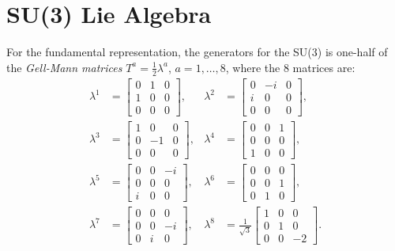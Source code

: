 \documentclass[aps,prb,superscriptaddress,nofootinbib]{revtex4}
\begin{document}
\section{SU(3) Lie Algebra}
For the fundamental representation, the generators for the SU(3) is one-half of the \textit{Gell-Mann matrices} $T^a = \frac{1}{2}\lambda^a$, $a=1,\dots,8$, where the 8 matrices are:
\begin{equation}
\begin{aligned}
	\lambda^1 &= \left[\begin{array}{ccc}
		0 & 1 & 0 \\ 1 & 0 & 0 \\ 0 & 0 & 0
	\end{array} \right], &
	\lambda^2 &= \left[\begin{array}{ccc}
		0 & -i & 0 \\ i & 0 & 0 \\ 0 & 0 & 0
	\end{array} \right], \\
	\lambda^3 &= \left[\begin{array}{ccc}
		1 & 0 & 0 \\ 0 & -1 & 0 \\ 0 & 0 & 0
	\end{array} \right], &
	\lambda^4 &= \left[\begin{array}{ccc}
		0 & 0 & 1 \\ 0 & 0 & 0 \\ 1 & 0 & 0
	\end{array} \right], \\
	\lambda^5 &= \left[\begin{array}{ccc}
		0 & 0 & -i \\ 0 & 0 & 0 \\ i & 0 & 0
	\end{array} \right], &
	\lambda^6 &= \left[\begin{array}{ccc}
		0 & 0 & 0 \\ 0 & 0 & 1 \\ 0 & 1 & 0
	\end{array} \right], \\
	\lambda^7 &= \left[\begin{array}{ccc}
		0 & 0 & 0 \\ 0 & 0 & -i \\ 0 & i & 0
	\end{array} \right], &
	\lambda^8 &= \frac{1}{\sqrt{3}}\left[\begin{array}{ccc}
		1 & 0 & 0 \\ 0 & 1 & 0 \\ 0 & 0 & -2
	\end{array} \right].
\end{aligned}
\end{equation}
\end{document}
